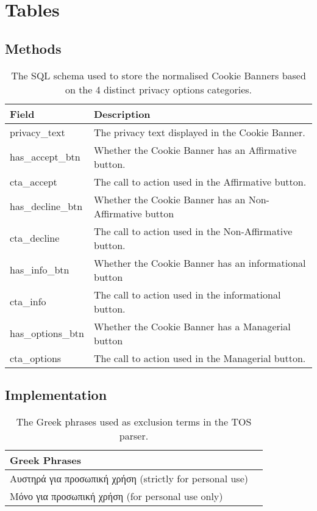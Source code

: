 \documentclass[../main.tex]{subfiles}
\begin{document}
\section{Tables}

\subsection*{Methods}
\begin{table}[ht]
    \centering
    \begin{tabular}{@{}ll@{}}
    \toprule
        \textbf{Field}    & \textbf{Description}                                    \\ \midrule
        privacy\_text     & The privacy text displayed in the Cookie Banner.        \\
        has\_accept\_btn  & Whether the Cookie Banner has an Affirmative button.    \\
        cta\_accept       & The call to action used in the Affirmative button.      \\
        has\_decline\_btn & Whether the Cookie Banner has an Non-Affirmative button \\
        cta\_decline      & The call to action used in the Non-Affirmative button.  \\
        has\_info\_btn    & Whether the Cookie Banner has an informational button   \\
        cta\_info         & The call to action used in the informational button.    \\
        has\_options\_btn & Whether the Cookie Banner has a Managerial button       \\
        cta\_options      & The call to action used in the Managerial button.       \\ \bottomrule
    \end{tabular}
    \caption{The SQL schema used to store the normalised Cookie Banners based on the 4 distinct privacy options categories.}
    \label{tab:methods_normalised_schema}
\end{table}

\subsection*{Implementation}
\begin{table}[ht]
    \centering
    \begin{tabular}{@{}ll@{}}
        \toprule
        \textbf{Greek Phrases}       \\ \midrule
        Αυστηρά για προσωπική χρήση (strictly for personal use)  \\
        Μόνο για προσωπική χρήση (for personal use only)     \\ \bottomrule
    \end{tabular}
    \caption{The Greek phrases used as exclusion terms in the TOS parser.}
    \label{tab:impl_greek_exclusion_terms}
\end{table}
\end{document}
